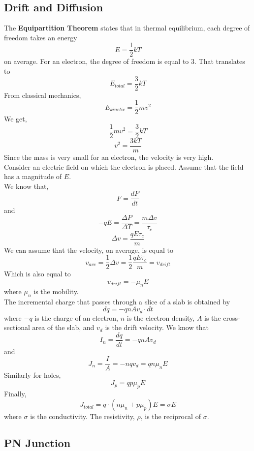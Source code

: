 \documentclass{article}
\begin{document}
\subsection{Drift and Diffusion}
\noindent 
The \textbf{Equipartition Theorem} states that in thermal equilibrium, each
degree of freedom takes an energy $$E = \frac{1}{2}kT$$ on average. For an electron, 
the degree of freedom is equal to 3. That translates to $$E_{total} = \frac{3}{2}kT$$
From classical mechanics, $$E_{kinetic}=\frac{1}{2}mv^2$$ 
We get, $$\frac{1}{2}mv^2 = \frac{3}{2}kT$$ $$v^2 = \frac{3kT}{m}$$ Since the mass 
is very small for an electron, the velocity is very high. 
\vspace{8pt}
\\ Consider an electric field on which the electron is placed. Assume that the field 
has a magnitude of $E$. 
\vspace{8pt}
\\We know that, $$F = \frac{dP}{dt}$$ and $$-qE = \frac{\Delta P}{\Delta T} 
= \frac{m\Delta v}{\tau_{c}}$$ $$\boxed{\Delta v = \frac{qE \tau_c}{m}}$$ We can assume 
that the velocity, on average, is equal to $$\boxed{v_{ave} = \frac{1}{2} \Delta v = 
\frac{1}{2} \frac{qE \tau_c}{m} = v_{drift}}$$
Which is also equal to $$\boxed{v_{drift} = -\mu_n E}$$ where $\mu_n$ is the mobility.
\vspace{8pt}
\\ The incremental charge that passes through a slice of a slab is obtained by 
$$dq = -qnAv_d \cdot dt$$
where $-q$ is the charge of an electron, $n$ is the electron density, $A$ is the 
cross-sectional area of the slab, and $v_d$ is the drift velocity. We know that 
$$I_n = \frac{dq}{dt} = -qnAv_{d}$$ and $$J_n = \frac{I}{A} =-nqv_d = qn\mu_n E$$
Similarly for holes, $$J_p = qp\mu_p E$$
Finally, $$\boxed{J_{total} = q\cdot(n\mu_n + p\mu_p)E = \sigma E}$$
where $\sigma$ is the conductivity. The resistivity, $\rho$, is the reciprocal of $\sigma$.

\newpage 
\subsection{PN Junction}
\end{document}
